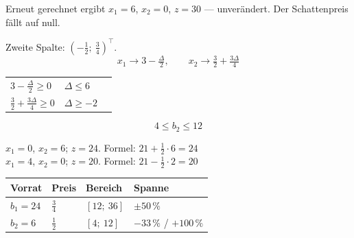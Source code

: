 \begin{aufgabe}
 Erneut gerechnet ergibt $x_1 = 6$, $x_2 = 0$, $z = 30$ --- unverändert. Der Schattenpreis fällt auf null.

Zweite Spalte: $\left(-\tfrac12;\ \tfrac34\right)^{\!\top}$.
\[ x_1 \to 3-\tfrac{\Delta}{2}, \qquad x_2 \to \tfrac32 + \tfrac{3\Delta}{4} \]

\begin{center}
\renewcommand{\arraystretch}{1.48}
\begin{tabular}{@{}P{2.8cm}P{2.4cm}P{2.4cm}@{}}
\toprule
$3-\tfrac{\Delta}{2}\ge0$ & $\Delta \le 6$ & \\
$\tfrac32+\tfrac{3\Delta}{4}\ge0$ & $\Delta \ge -2$ & \\
\bottomrule
\end{tabular}
\end{center}

\[ 4 \le b_2 \le 12 \]

 $x_1 = 0$, $x_2 = 6$; $z = 24$. Formel: $21+\tfrac12\cdot6 = 24$ \checkmark\\
 $x_1 = 4$, $x_2 = 0$; $z = 20$. Formel: $21-\tfrac12\cdot2 = 20$ \checkmark

\begin{center}
\renewcommand{\arraystretch}{1.48}
\begin{tabular}{@{}P{1.8cm}P{1.8cm}P{2.2cm}P{2.2cm}@{}}
\toprule
\textbf{Vorrat} & \textbf{Preis} & \textbf{Bereich} & \textbf{Spanne}\\
\midrule
$b_1 = 24$ & $\tfrac34$ & $[12;\ 36]$ & $\pm 50\,\%$\\
$b_2 = 6$ & $\tfrac12$ & $[4;\ 12]$ & $-33\,\%$ / $+100\,\%$\\
\bottomrule
\end{tabular}
\end{center}

\begin{center}
\begin{minipage}{0.86\textwidth}
\end{minipage}
\end{center}
\end{aufgabe}

